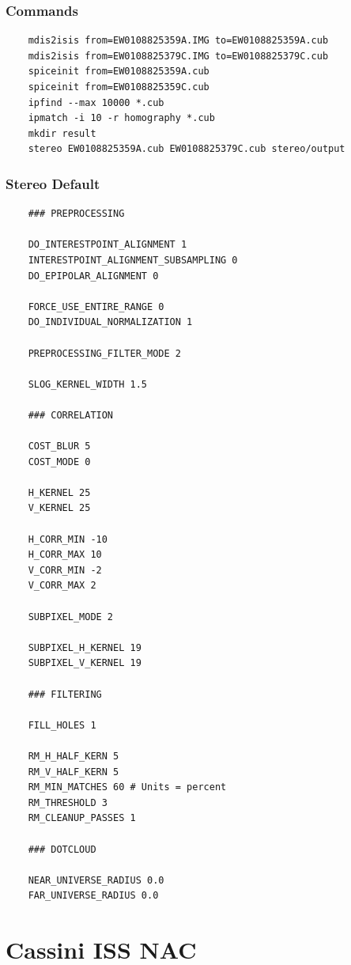 \subsubsection*{Commands}

\begin{verbatim}
    mdis2isis from=EW0108825359A.IMG to=EW0108825359A.cub
    mdis2isis from=EW0108825379C.IMG to=EW0108825379C.cub
    spiceinit from=EW0108825359A.cub
    spiceinit from=EW0108825359C.cub
    ipfind --max 10000 *.cub
    ipmatch -i 10 -r homography *.cub
    mkdir result
    stereo EW0108825359A.cub EW0108825379C.cub stereo/output
\end{verbatim}

\subsubsection*{Stereo Default}

\begin{verbatim}
    ### PREPROCESSING

    DO_INTERESTPOINT_ALIGNMENT 1
    INTERESTPOINT_ALIGNMENT_SUBSAMPLING 0
    DO_EPIPOLAR_ALIGNMENT 0

    FORCE_USE_ENTIRE_RANGE 0
    DO_INDIVIDUAL_NORMALIZATION 1

    PREPROCESSING_FILTER_MODE 2

    SLOG_KERNEL_WIDTH 1.5

    ### CORRELATION

    COST_BLUR 5
    COST_MODE 0

    H_KERNEL 25
    V_KERNEL 25

    H_CORR_MIN -10
    H_CORR_MAX 10
    V_CORR_MIN -2
    V_CORR_MAX 2

    SUBPIXEL_MODE 2

    SUBPIXEL_H_KERNEL 19
    SUBPIXEL_V_KERNEL 19

    ### FILTERING

    FILL_HOLES 1

    RM_H_HALF_KERN 5
    RM_V_HALF_KERN 5
    RM_MIN_MATCHES 60 # Units = percent
    RM_THRESHOLD 3
    RM_CLEANUP_PASSES 1

    ### DOTCLOUD

    NEAR_UNIVERSE_RADIUS 0.0
    FAR_UNIVERSE_RADIUS 0.0

\end{verbatim}

\section{Cassini ISS NAC}

